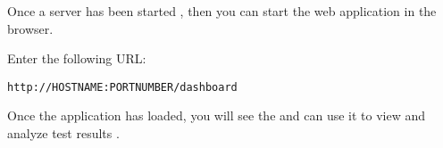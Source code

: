 Once a \dash{} server has been started , then you can start the web application in the browser. 

Enter the following URL:\\
\begin{verbatim}
http://HOSTNAME:PORTNUMBER/dashboard
\end{verbatim}

Once the application has loaded, you will see the \reportpersp{} and can use it to view and analyze test results .
